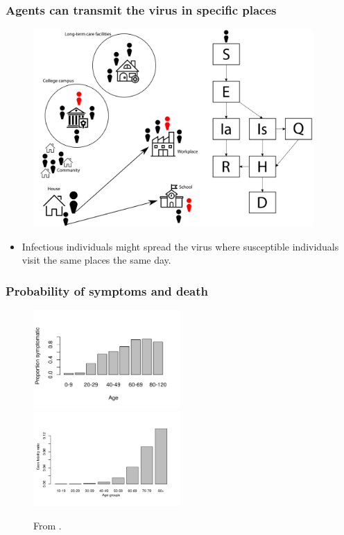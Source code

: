 \documentclass[usenames,dvipsnames]{beamer}
\begin{document}
\begin{frame}
  \frametitle{Agents can transmit the virus in specific places}

  \begin{figure}
    \includegraphics[width=0.95\textwidth]{./images/FRED_transmission.png}
  \end{figure}
  \begin{itemize}
  \item Infectious individuals might spread the virus where susceptible individuals visit the same places the same day.
  \end{itemize}    
\end{frame}



\begin{frame}
  \frametitle{Probability of symptoms and death}
  \begin{figure}
    \includegraphics[width=0.5\textwidth]{./figures/manuscript_figure_age_symptoms.jpeg}
    \includegraphics[width=0.5\textwidth]{./figures/manuscript_figure_age_CFR.jpeg}
    \caption{ From \citep{Verity2020_LancetID, ChinaCDC2020_weekly}.}
  \end{figure}
\end{frame}
\end{document}
